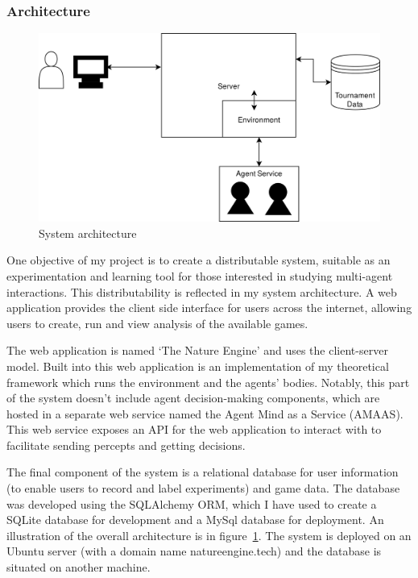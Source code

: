 \documentclass[]{final_report}
\begin{document}
\subsubsection{Architecture}
\begin{figure}
\vspace{-30pt}
\begin{framed}
	\begin{center}
	\includegraphics[width=\textwidth]{PresSystem.png}
	\caption{System architecture}
	\label{fig:architecture}
	\end{center}
\end{framed}
\vspace{-30pt}
\end{figure}
One objective of my project is to create a distributable system, suitable as an experimentation and learning tool for those interested in studying multi-agent interactions. This distributability is reflected in my system architecture. A web application provides the client side interface for users across the internet, allowing users to create, run and view analysis of the available games.\par 
The web application is named `The Nature Engine' and uses the client-server model. Built into this web application is an implementation of my theoretical framework which runs the environment and the agents' bodies. Notably, this part of the system doesn't include agent decision-making components, which are hosted in a separate web service named the Agent Mind as a Service (AMAAS). This web service exposes an API for the web application to interact with to facilitate sending percepts and getting decisions.\par 
The final component of the system is a relational database for user information (to enable users to record and label experiments) and game data. The database was developed using the SQLAlchemy ORM, which I have used to create a SQLite database for development and a MySql database for deployment. An illustration of the overall architecture is in figure~\ref{fig:architecture}. The system is deployed on an Ubuntu server (with a domain name natureengine.tech) and the database is situated on another machine.
\end{document}

